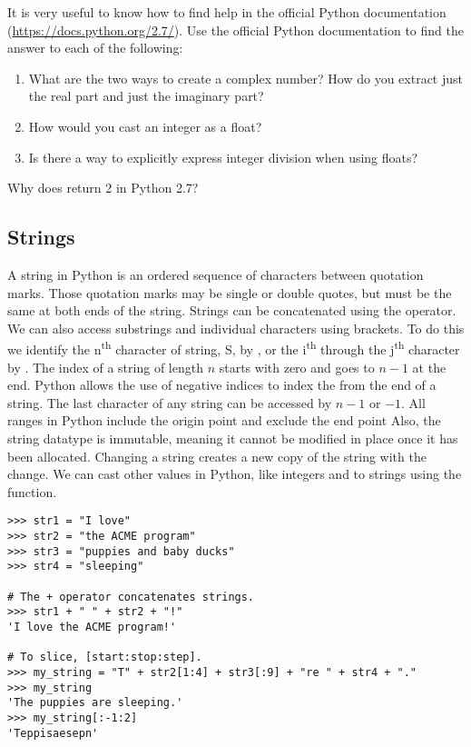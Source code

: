 \begin{problem}
It is very useful to know how to find help in the official Python documentation  (\url{https://docs.python.org/2.7/}). Use the official Python documentation to find the answer to each of the following:

\begin{enumerate}

\item What are the two ways to create a complex number? 
How do you extract just the real part and just the imaginary part?
\item How would you cast an integer as a float?
\item Is there a way to explicitly express integer division when using floats?
\end{enumerate}
\end{problem}

\begin{problem}
Why does  return 2 in Python 2.7? 
\end{problem}

\subsection*{Strings}
\begin{example}
A string in Python is an ordered sequence of characters 
between quotation marks. Those quotation marks may be single or double quotes, but must be the same at both ends of the string.
Strings can be concatenated using the \li{+} operator. We can also access substrings and individual characters using brackets. To do this we identify the n\textsuperscript{th} character of string, S, by , or the i\textsuperscript{th} through the j\textsuperscript{th} character by .
The index of a string of length $n$ starts with zero and goes to $n-1$ at the end.
Python allows the use of negative indices to index the from the end of a string.
The last character of any string can be accessed by $n-1$ or $-1$.
All ranges in Python include the origin point and exclude the end point
Also, the string datatype is immutable, meaning it cannot be modified in place once it has been allocated.
Changing a string creates a new copy of the string with the change.
We can cast other values in Python, like integers and  to strings using the  function.
\begin{lstlisting}
>>> str1 = "I love"
>>> str2 = "the ACME program"
>>> str3 = "puppies and baby ducks"
>>> str4 = "sleeping"

# The + operator concatenates strings.
>>> str1 + " " + str2 + "!"
'I love the ACME program!'

# To slice, [start:stop:step].
>>> my_string = "T" + str2[1:4] + str3[:9] + "re " + str4 + "."
>>> my_string
'The puppies are sleeping.'
>>> my_string[:-1:2]
'Teppisaesepn'
\end{lstlisting}
\end{example}

